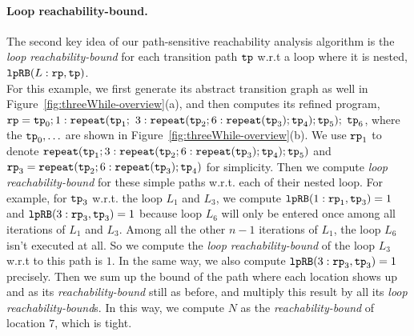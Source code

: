 \paragraph*{Loop reachability-bound.}
The second key idea of our path-sensitive reachability analysis algorithm is the
\emph{loop reachability-bound} for each transition path $\mathtt{tp}$ w.r.t a loop where it is nested,
$\mathtt{lpRB}(L:\mathtt{rp}, \mathtt{tp})$.
\\
For this example, we first generate its abstract transition graph as well in Figure~\ref{fig:threeWhile-overview}(a),
and then computes its refined program,
$\mathtt{rp} = \mathtt{tp}_0; 1: \mathtt{repeat}(\mathtt{tp}_1;$ 
$3: {\mathtt{repeat}(\mathtt{tp}_2; 6 : {\mathtt{repeat}(\mathtt{tp}_3)}; \mathtt{tp}_4)}; \mathtt{tp}_5);$ 
$\mathtt{tp}_6$,
where the $\mathtt{tp}_0, \ldots$ are shown in Figure~\ref{fig:threeWhile-overview}(b).
We use $\mathtt{rp}_1$ to denote ${\mathtt{repeat}(\mathtt{tp}_1; 3: {\mathtt{repeat}(\mathtt{tp}_2; 6 : {\mathtt{repeat}(\mathtt{tp}_3)}; \mathtt{tp}_4)}; \mathtt{tp}_5)}$
and $\mathtt{rp}_3 = {\mathtt{repeat}(\mathtt{tp}_2; 6 : {\mathtt{repeat}(\mathtt{tp}_3)}; \mathtt{tp}_4)}$
for simplicity.
Then we compute \emph{loop reachability-bound} for these simple paths w.r.t. each of their nested loop.
For example, for $\mathtt{tp}_3$ w.r.t. the loop $L_1$ and $L_3$, we compute
$\mathtt{lpRB}(1: \mathtt{rp}_1, \mathtt{tp}_3) = 1$ and
$\mathtt{lpRB}(3: \mathtt{rp}_3, \mathtt{tp}_3) = 1$ because loop $L_6$ will only be entered once among all iterations of $L_1$ and $L_3$.
Among all the other $n - 1$ iterations of $L_1$, the loop $L_6$ isn't executed at all.
So we compute the \emph{loop reachability-bound}  of the loop $L_3$
w.r.t to this path is $1$.
In the same way, we also compute $\mathtt{lpRB}(3: \mathtt{rp}_3, \mathtt{tp}_3) = 1$ precisely.
Then we sum up the bound of the path where each location shows up
and as its \emph{reachability-bound} still as before,
and multiply this result by all its \emph{loop reachability-bound}s.
In this way, we compute $N$ as the \emph{reachability-bound} of location $7$, which is tight.

